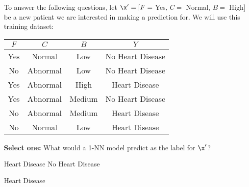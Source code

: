 \begin{parts}
To answer the following questions, let $\x' = [F=$ Yes, $C=$ Normal, $B=$ High$]$ be a new patient we are interested in making a prediction for. We will use this training dataset:

\begin{table}[h!]
    \centering
    \begin{tabular}{c|c|c|c}
        $F$ & $C$ & $B$ & $Y$ \\ \hline
        Yes & Normal & Low & No Heart Disease \\ \hline
        No & Abnormal & Low & No Heart Disease \\ \hline
        Yes & Abnormal & High & Heart Disease \\ \hline
        Yes & Abnormal & Medium & No Heart Disease \\ \hline
        No & Abnormal & Medium & Heart Disease \\ \hline
        No & Normal & Low & Heart Disease \\ \hline
    \end{tabular}
\end{table}

\begin{comment}
\begin{table}[h!]
    \centering
    \begin{tabular}{c|c|c|c|c|c}
        $i$ & $F$ & $C$ & $B$ & $Y$ & $d(\x^{(i)}, \x')$ \\ \hline
        1 & Yes & Normal & Low & No Heart Disease & 2 \\ \hline
        2 & No & Abnormal & Low & No Heart Disease & 4 \\ \hline
        3 & Yes & Abnormal & High & Heart Disease & 1 \\ \hline
        4 & Yes & Abnormal & Medium & No Heart Disease & 2 \\ \hline
        5 & No & Abnormal & Medium & Heart Disease & 3 \\ \hline
        6 & No & Normal & Low & Heart Disease & 3 \\ \hline
    \end{tabular}
\end{table}

Note that we have precomputed the distances between $\x'$ and all the training data points in the last column of the table above. 
\end{comment}

\begin{subparts}
    \subpart[1] \textbf{Select one:} What would a 1-NN model predict as the label for $\x'$?
    \begin{checkboxes}
        \choice Heart Disease
        \choice No Heart Disease
    \end{checkboxes}
    \begin{soln}
        Heart Disease
    \end{soln}
    

\end{subparts}
\end{parts}
